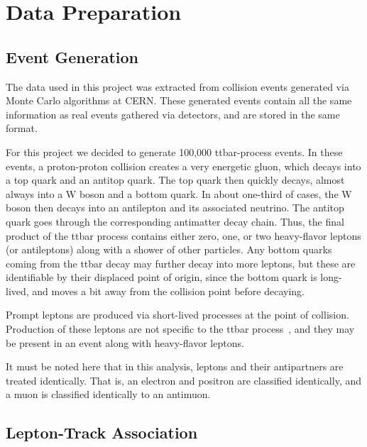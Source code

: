 \section{Data Preparation}\label{sec:dataprep}

\subsection{Event Generation}

The data used in this project was extracted from collision events generated via Monte Carlo algorithms at CERN. These generated events contain all the same information as real events gathered via detectors, and are stored in the same format.


For this project we decided to generate 100,000 ttbar-process events. In these events, a proton-proton collision creates a very energetic gluon, which decays into a top quark and an antitop quark. The top quark then quickly decays, almost always into a W boson and a bottom quark. In about one-third of cases, the W boson then decays into an antilepton and its associated neutrino. The antitop quark goes through the corresponding antimatter decay chain. Thus, the final product of the ttbar process contains either zero, one, or two heavy-flavor leptons (or antileptons) along with a shower of other particles. Any bottom quarks coming from the ttbar decay may further decay into more leptons, but these are identifiable by their displaced point of origin, since the bottom quark is long-lived, and moves a bit away from the collision point before decaying.

Prompt leptons are produced via short-lived processes at the point of collision. Production of these leptons are not specific to the ttbar process~\cite{ref:prompt}, and they may be present in an event along with heavy-flavor leptons.

It must be noted here that in this analysis, leptons and their antipartners are treated identically. That is, an electron and positron are classified identically, and a muon is classified identically to an antimuon.


\subsection{Lepton-Track Association}


